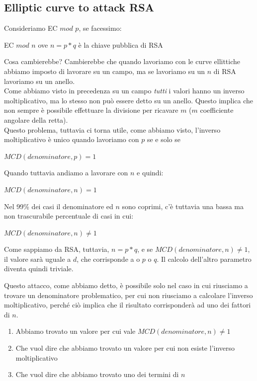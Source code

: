 \documentclass[11pt, oneside]{article}   	%
\begin{document}
\subsection*{Elliptic curve to attack RSA}
Consideriamo EC $mod$ $p$, se facessimo:
\begin{center}
EC $mod$ $n$ ove $n = p * q$ è la chiave pubblica di RSA
\end{center}
Cosa cambierebbe? Cambierebbe che quando lavoriamo con le curve ellittiche abbiamo imposto di lavorare su un campo, ma se lavoriamo su un $n$ di RSA lavoriamo su un anello.\\
Come abbiamo visto in precedenza su un campo \emph{tutti} i valori hanno un inverso moltiplicativo, ma lo stesso non può essere detto su un anello. Questo implica che non sempre è possibile effettuare la divisione per ricavare $m$ ($m$ coefficiente angolare della retta).\\

Questo problema, tuttavia ci torna utile, come abbiamo visto, l'inverso moltiplicativo è unico quando lavoriamo con $p$ se e solo se
\begin{center}
$MCD(denominatore, p) = 1$
\end{center}
Quando tuttavia andiamo a lavorare con $n$ e quindi:
\begin{center}
$MCD(denominatore, n) = 1$
\end{center}
Nel 99\% dei casi il denominatore ed $n$ sono coprimi, c'è tuttavia una bassa ma non trascurabile percentuale di casi in cui:
\begin{center}
$MCD(denominatore, n) \neq 1$
\end{center}
Come sappiamo da RSA, tuttavia, $n = p * q$, e se $MCD(denominatore, n) \neq 1$, il valore sarà uguale a $d$, che corrisponde a o $p$ o $q$. Il calcolo dell'altro parametro diventa quindi triviale.

Questo attacco, come abbiamo detto, è possibile solo nel caso in cui riusciamo a trovare un denominatore problematico, per cui non riusciamo a calcolare l'inverso moltiplicativo, perché ciò implica che il risultato corrisponderà ad uno dei fattori di $n$.
\begin{enumerate}
\item Abbiamo trovato un valore per cui vale $MCD(denominatore, n) \neq 1$
\item Che vuol dire che abbiamo trovato un valore per cui non esiste l'inverso moltiplicativo
\item Che vuol dire che abbiamo trovato uno dei termini di $n$
\end{enumerate}
\end{document}
